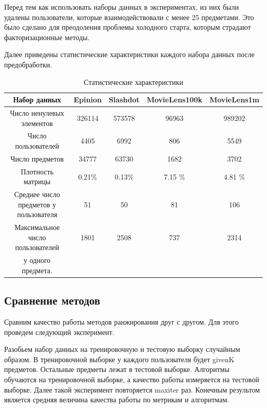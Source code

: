 \documentclass[a4paper,12pt]{article}
\begin{document}
Перед тем как использовать наборы данных в экспериментах, из них были удалены пользователи, которые взаимодействовали с менее  25 предметами. Это было сделано для преодоления проблемы холодного старта, которым страдают факторизационные методы. 

Далее приведены статистические характеристики каждого набора данных после предобработки. 



\begin{table}[H]
\caption{\label{tab:canonsummary}Статистические характеристики}
\begin{center}
\begin{tabular}{|c|c c c c|}
\hline
Набор данных  & Epinion & Slashdot & MovieLens100k & MovieLens1m\\
\hline
Число ненулевых элементов & 326114 & 573578 & 96963  & 989202 \\
Число пользователей & 4405 & 6992 & 806 & 5549\\
Число предметов & 34777 & 63730 & 1682 & 3702\\
Плотность матрицы & 0.21\% & 0.13\% & 7.15 \% & 4.81 \% \\
Среднее число предметов у пользователя & 51  & 50 & 81 & 106\\
Максимальное число пользователей & 1801 & 2508 & 737 & 2314\\
у одного предмета.  & & & &\\
\hline
\end{tabular}
\end{center}
\end{table} 

\subsection{Сравнение методов}
 Сравним качество работы методов ранжирования друг с другом. Для этого проведем следующий эксперимент.
 
 Разобьем набор данных на тренировочную и тестовую выборку случайным образом. В тренировочной выборке у каждого пользователя будет givenK предметов. Остальные предметы лежат в тестовой выборке. Алгоритмы обучаются на тренировочной выборке, а качество работы измеряется на тестовой выборке. Далее такой эксперимент повторяется maxiter раз. Конечным результом является средняя величина качества работы по метрикам и алгоритмам. 
 
\end{document}
